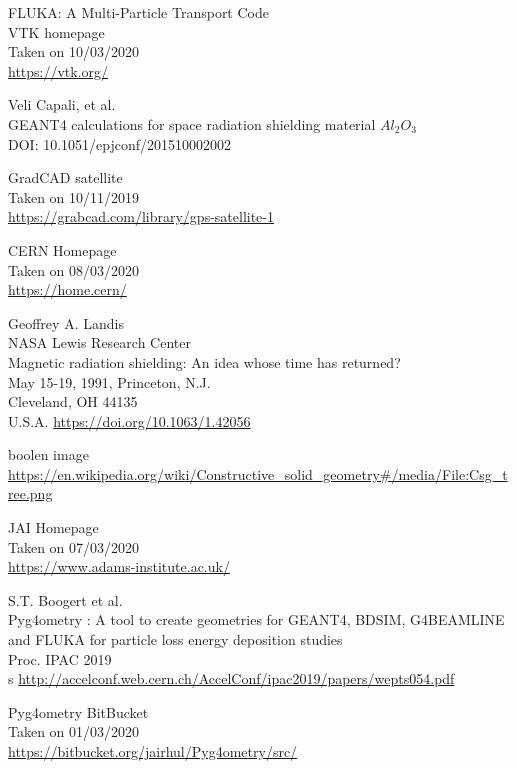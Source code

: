 \documentclass[12pt,a4paper]{article}
\begin{document}
\begin{thebibliography}{1}

	
	FLUKA: A Multi-Particle Transport Code\\
	
	VTK homepage\\
	Taken on 10/03/2020\\
	\url{https://vtk.org/}

	Veli Capali, et al.\\
	GEANT4 calculations for space radiation shielding material $Al_2O_3$\\
	DOI: 10.1051/epjconf/201510002002

	GradCAD satellite\\
	Taken on 10/11/2019\\	
	\url{https://grabcad.com/library/gps-satellite-1}

	CERN Homepage\\
	Taken on 08/03/2020\\
	\url{https://home.cern/}
	
	Geoffrey A. Landis\\
	NASA Lewis Research Center\\
	Magnetic radiation shielding: An idea whose time has returned?\\
	May 15-19, 1991, Princeton, N.J.\\
	Cleveland, OH 44135\\
	U.S.A.
	\url{https://doi.org/10.1063/1.42056}
	
	boolen image\\
	\url{https://en.wikipedia.org/wiki/Constructive_solid_geometry#/media/File:Csg_tree.png}
	
	JAI Homepage\\
	Taken on 07/03/2020\\
	\url{https://www.adams-institute.ac.uk/}

	S.T. Boogert et al.\\
	Pyg4ometry : A tool to create geometries for GEANT4, BDSIM, G4BEAMLINE and FLUKA for particle loss energy deposition studies\\
	Proc. IPAC 2019\\s
	\url{http://accelconf.web.cern.ch/AccelConf/ipac2019/papers/wepts054.pdf}

	Pyg4ometry BitBucket\\
	Taken on 01/03/2020\\
	\url{https://bitbucket.org/jairhul/Pyg4ometry/src/}
	

\end{thebibliography}
\end{document}
